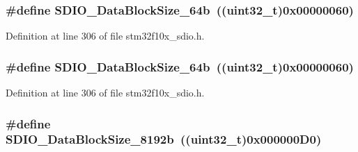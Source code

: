 \subsubsection[{\texorpdfstring{S\+D\+I\+O\+\_\+\+Data\+Block\+Size\+\_\+64b}{SDIO_DataBlockSize_64b}}]{\setlength{\rightskip}{0pt plus 5cm}\#define S\+D\+I\+O\+\_\+\+Data\+Block\+Size\+\_\+64b~(({\bf uint32\+\_\+t})0x00000060)}\hypertarget{group___s_d_i_o___data___block___size_ga981c219228ae8df11a501e15843338d4}{}\label{group___s_d_i_o___data___block___size_ga981c219228ae8df11a501e15843338d4}


Definition at line 306 of file stm32f10x\+\_\+sdio.\+h.

\subsubsection[{\texorpdfstring{S\+D\+I\+O\+\_\+\+Data\+Block\+Size\+\_\+64b}{SDIO_DataBlockSize_64b}}]{\setlength{\rightskip}{0pt plus 5cm}\#define S\+D\+I\+O\+\_\+\+Data\+Block\+Size\+\_\+64b~(({\bf uint32\+\_\+t})0x00000060)}\hypertarget{group___s_d_i_o___data___block___size_ga981c219228ae8df11a501e15843338d4}{}\label{group___s_d_i_o___data___block___size_ga981c219228ae8df11a501e15843338d4}


Definition at line 306 of file stm32f10x\+\_\+sdio.\+h.

\subsubsection[{\texorpdfstring{S\+D\+I\+O\+\_\+\+Data\+Block\+Size\+\_\+8192b}{SDIO_DataBlockSize_8192b}}]{\setlength{\rightskip}{0pt plus 5cm}\#define S\+D\+I\+O\+\_\+\+Data\+Block\+Size\+\_\+8192b~(({\bf uint32\+\_\+t})0x000000\+D0)}\hypertarget{group___s_d_i_o___data___block___size_gaf61913f3eff52c0f728db9ffbdaca7d2}{}\label{group___s_d_i_o___data___block___size_gaf61913f3eff52c0f728db9ffbdaca7d2}


